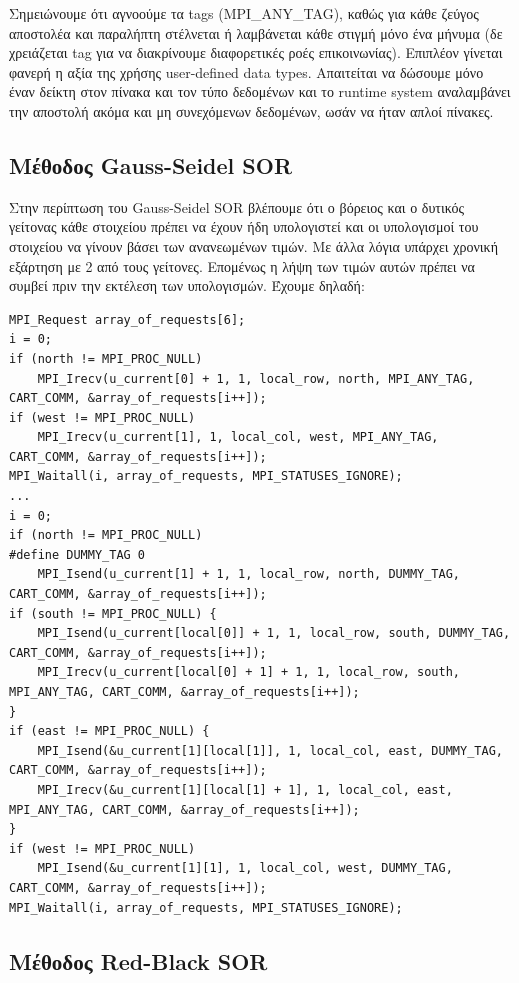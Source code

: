 \documentclass[12pt,titlepage]{article}
\begin{document}
Σημειώνουμε ότι αγνοούμε τα tags (MPI\_ANY\_TAG), καθώς για κάθε ζεύγος
αποστολέα και παραλήπτη στέλνεται ή λαμβάνεται κάθε στιγμή μόνο ένα μήνυμα (δε
χρειάζεται tag για να διακρίνουμε διαφορετικές ροές επικοινωνίας). Επιπλέον
γίνεται φανερή η αξία της χρήσης user-defined data types. Απαιτείται να δώσουμε
μόνο έναν δείκτη στον πίνακα και τον τύπο δεδομένων και το runtime system
αναλαμβάνει την αποστολή ακόμα και μη συνεχόμενων δεδομένων, ωσάν να ήταν απλοί
πίνακες.

\subsection{Μέθοδος Gauss-Seidel SOR}

Στην περίπτωση του Gauss-Seidel SOR βλέπουμε ότι ο βόρειος και ο δυτικός
γείτονας κάθε στοιχείου πρέπει να έχουν ήδη υπολογιστεί και οι υπολογισμοί του
στοιχείου να γίνουν βάσει των ανανεωμένων τιμών. Με άλλα λόγια υπάρχει χρονική
εξάρτηση με 2 από τους γείτονες. Επομένως η λήψη των τιμών αυτών πρέπει να
συμβεί πριν την εκτέλεση των υπολογισμών. Έχουμε δηλαδή:

\begin{verbatim}
MPI_Request array_of_requests[6];
i = 0;
if (north != MPI_PROC_NULL)
    MPI_Irecv(u_current[0] + 1, 1, local_row, north, MPI_ANY_TAG, CART_COMM, &array_of_requests[i++]);
if (west != MPI_PROC_NULL)
    MPI_Irecv(u_current[1], 1, local_col, west, MPI_ANY_TAG, CART_COMM, &array_of_requests[i++]);
MPI_Waitall(i, array_of_requests, MPI_STATUSES_IGNORE);
...
i = 0;
if (north != MPI_PROC_NULL)
#define DUMMY_TAG 0
    MPI_Isend(u_current[1] + 1, 1, local_row, north, DUMMY_TAG, CART_COMM, &array_of_requests[i++]);
if (south != MPI_PROC_NULL) {
    MPI_Isend(u_current[local[0]] + 1, 1, local_row, south, DUMMY_TAG, CART_COMM, &array_of_requests[i++]);
    MPI_Irecv(u_current[local[0] + 1] + 1, 1, local_row, south, MPI_ANY_TAG, CART_COMM, &array_of_requests[i++]);
}
if (east != MPI_PROC_NULL) {
    MPI_Isend(&u_current[1][local[1]], 1, local_col, east, DUMMY_TAG, CART_COMM, &array_of_requests[i++]);
    MPI_Irecv(&u_current[1][local[1] + 1], 1, local_col, east, MPI_ANY_TAG, CART_COMM, &array_of_requests[i++]);
}
if (west != MPI_PROC_NULL)
    MPI_Isend(&u_current[1][1], 1, local_col, west, DUMMY_TAG, CART_COMM, &array_of_requests[i++]);
MPI_Waitall(i, array_of_requests, MPI_STATUSES_IGNORE);
\end{verbatim}

\subsection{Μέθοδος Red-Black SOR}
\end{document}

